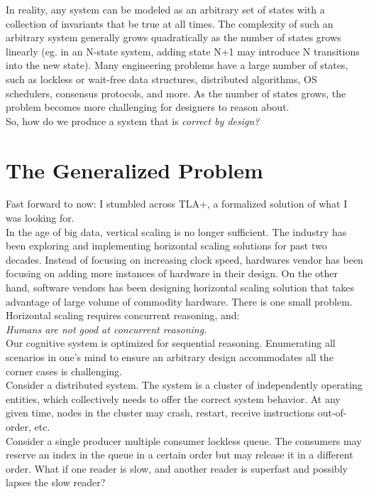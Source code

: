 In reality, any system can be modeled as an arbitrary set of states with a
collection of invariants that be true at all times. The complexity of such an
arbitrary system generally grows quadratically as the number of states grows
linearly (eg. in an N-state system, adding state N+1 may introduce N transitions
into the new state). Many engineering problems have a large number of states,
such as lockless or wait-free data structures, distributed algorithms, OS
schedulers, consensus protocols, and more. As the number of states grows, the
problem becomes more challenging for designers to reason about.\\

So, how do we produce a system that is \textit{correct by design?} 

\section{The Generalized Problem}

Fast forward to now: I stumbled across TLA+, a formalized solution of what I
was looking for.\\

In the age of big data, vertical scaling is no longer sufficient. The industry
has been exploring and implementing horizontal scaling solutions for past two
decades. Instead of focusing on increasing clock speed, hardwares vendor has
been focusing on adding more instances of hardware in their design. On the other
hand, software vendors has been designing horizontal scaling solution that takes
advantage of large volume of commodity hardware. There is one small problem.
Horizontal scaling requires concurrent reasoning, and:\\

\textit{Humans are not good at concurrent reasoning}.\\

Our cognitive system is optimized for sequential reasoning. Enumerating
all scenarios in one's mind to ensure an arbitrary design accommodates all
the corner cases is challenging.\\

Consider a distributed system. The system is a cluster of independently
operating entities, which collectively needs to offer the correct system
behavior. At any given time, nodes in the cluster may crash, restart, receive 
instructions out-of-order, etc.\\ 

Consider a single producer multiple consumer lockless queue. The consumers may
reserve an index in the queue in a certain order but may release it in a
different order. What if one reader is slow, and another reader is superfast
and possibly lapses the slow reader?\\

